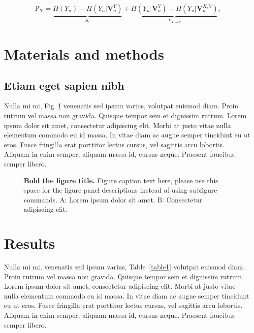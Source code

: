 \documentclass[10pt,letterpaper]{article}
\begin{document}
\begin{eqnarray}
\label{eq:schemeP}
	\mathrm{P_Y} = \underbrace{H(Y_n) - H(Y_n|\mathbf{V}^{Y}_{n})}_{S_Y} + \underbrace{H(Y_n|\mathbf{V}^{Y}_{n})- H(Y_n|\mathbf{V}^{X,Y}_{n})}_{T_{X\rightarrow Y}},
\end{eqnarray}

\section*{Materials and methods}
\subsection*{Etiam eget sapien nibh}

Nulla mi mi, Fig~\ref{fig1} venenatis sed ipsum varius, volutpat euismod diam. Proin rutrum vel massa non gravida. Quisque tempor sem et dignissim rutrum. Lorem ipsum dolor sit amet, consectetur adipiscing elit. Morbi at justo vitae nulla elementum commodo eu id massa. In vitae diam ac augue semper tincidunt eu ut eros. Fusce fringilla erat porttitor lectus cursus,  vel sagittis arcu lobortis. Aliquam in enim semper, aliquam massa id, cursus neque. Praesent faucibus semper libero.

\begin{figure}[!h]
\caption{\textbf{Bold the figure title.}
Figure caption text here, please use this space for the figure panel descriptions instead of using subfigure commands. A: Lorem ipsum dolor sit amet. B: Consectetur adipiscing elit.}
\label{fig1}
\end{figure}

\section*{Results}
Nulla mi mi, venenatis sed ipsum varius, Table~\ref{table1} volutpat euismod diam. Proin rutrum vel massa non gravida. Quisque tempor sem et dignissim rutrum. Lorem ipsum dolor sit amet, consectetur adipiscing elit. Morbi at justo vitae nulla elementum commodo eu id massa. In vitae diam ac augue semper tincidunt eu ut eros. Fusce fringilla erat porttitor lectus cursus, vel sagittis arcu lobortis. Aliquam in enim semper, aliquam massa id, cursus neque. Praesent faucibus semper libero.
\end{document}
